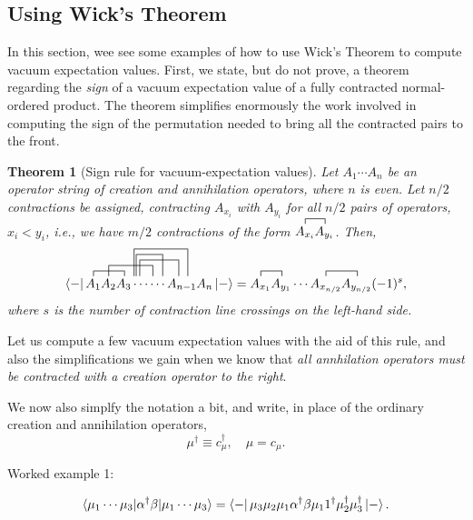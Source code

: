 \documentclass{report}
\theoremstyle{plain}
\newtheorem{theorem}{Theorem}[chapter]
\theoremstyle{definition}
\begin{document}
\subsection{Using Wick's Theorem}

In this section, wee see some examples of how to use Wick's Theorem to
compute vacuum expectation values. First, we state, but do not prove,
a theorem regarding the \emph{sign} of a vacuum expectation value of a
fully contracted normal-ordered product. The theorem simplifies
enormously the work involved in computing the sign of the permutation
needed to bring all the contracted pairs to the front.

\begin{theorem}[Sign rule for vacuum-expectation values]
  Let $A_1\cdots A_n$ be an operator string of creation and
  annihilation operators, where $n$ is even. Let $n/2$ contractions be
  assigned, contracting $A_{x_i}$ with $A_{y_i}$ for all $n/2$ pairs of
  operators, $x_i < y_i$, i.e., we have $m/2$ contractions of the
  form $\contraction{}{A_{x_i}}{}{A_{y_i}} A_{x_i} A_{y_i}$.
  Then,
  \begin{equation}
    \bra{-} \contraction{}{A_1}{A_2}{A_3}
    \contraction[2ex]{A_1}{A_2}{A_3\cdots}{.} A_1
    A_2\contraction[5ex]{A.}{A}{\hspace{8ex}}{A}  A_3
    \contraction[4ex]{}{A}{\hspace{3ex}}{A}\contraction[3ex]{.}{A}{\cdots}{A_{n-1}} \cdots \cdots A_{n-1} A_n \ket{-} =
    \contraction{}{A_{x_1}}{}{A_{y_1}} A_{x_1} A_{y_1} \cdots
    \contraction{}{A_{x_{n/2}}}{}{A_{y_{n/2}}} A_{x_{n/2}} A_{y_{n/2}} (-1)^s,
  \end{equation}
  where $s$ is the number of contraction line crossings on the
  left-hand side.
\end{theorem}

Let us compute a few vacuum expectation values with the aid of this
rule, and also the simplifications we gain when we know that \emph{all
  annhilation operators must be contracted with a creation operator to
  the right}.

We now also simplfy the notation a bit, and write, in place of the
ordinary creation and annihilation operators,
\[ \mu^\dag \equiv c^\dag_\mu, \quad \mu = c_\mu .\]

Worked example 1:

\begin{equation}
  \braket{\mu_1\cdots\mu_3|\alpha^\dag \beta | \mu_1\cdots \mu_3} = \bra{-} \mu_3
\mu_2  \mu_1 \alpha^\dag \beta \mu_11^\dag \mu_2^\dag \mu_3^\dag
  \ket{-}.
\end{equation}
\end{document}
